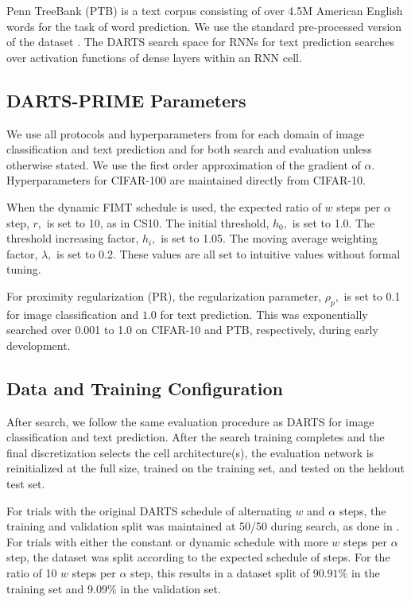 \documentclass[letterpaper]{article} \usepackage{aaai22}  \usepackage{times}  \usepackage{helvet}  \usepackage{courier}  \usepackage[hyphens]{url}  \usepackage{graphicx} \urlstyle{rm} \def\UrlFont{\rm}  \usepackage{natbib}  \usepackage{caption} \DeclareCaptionStyle{ruled}{labelfont=normalfont,labelsep=colon,strut=off} \frenchspacing  \setlength{\pdfpagewidth}{8.5in}  \setlength{\pdfpageheight}{11in}  \usepackage{algorithm}
\begin{document}
Penn TreeBank \cite{marcus1993building} (PTB) is a text corpus consisting of over 4.5M American English words for the task of word prediction. We
use the standard pre-processed version of the dataset \cite{pham2018efficient, liu2018darts}. The DARTS search space for RNNs for text prediction searches over activation functions of dense layers within an RNN cell. 

\subsection{DARTS-PRIME Parameters}

We use all protocols and hyperparameters from \cite{liu2018darts} for each domain of image classification and text prediction and for both search and evaluation unless otherwise stated.  We use the first order approximation of the gradient of $\alpha$. Hyperparameters for CIFAR-100 are maintained directly from CIFAR-10. 

When the dynamic FIMT schedule is used, the expected ratio of $w$ steps per $\alpha$ step, $r,$ is set to 10, as in CS10. The initial threshold, $h_0,$ is set to 1.0. The threshold increasing factor, $h_i,$ is set to 1.05. The moving average weighting factor, $\lambda,$ is set to 0.2. These values are all set to intuitive values without formal tuning.

For proximity regularization (PR), the regularization parameter, $\rho_{p},$ is set to 0.1 for image classification and $1.0$ for text prediction. This was exponentially searched over 0.001 to 1.0 on CIFAR-10 and PTB, respectively, during early development.

\subsection{Data and Training Configuration}

After search, we follow the same evaluation procedure as DARTS for image classification and text prediction. After the search training completes and the final discretization selects the cell architecture(s), the evaluation network is reinitialized at the full size, trained on the training set, and tested on the heldout test set.

For trials with the original DARTS schedule of alternating $w$ and $\alpha$ steps, the training and validation split was maintained at 50/50 during search, as done in \cite{liu2018darts}. For trials with either the constant or dynamic schedule with more $w$ steps per $\alpha$ step, the dataset was split according to the expected schedule of steps. For the ratio of 10 $w$ steps per $\alpha$ step, this results in a dataset split of $90.91\%$ in the training set and $9.09\%$ in the validation set.
\end{document}
